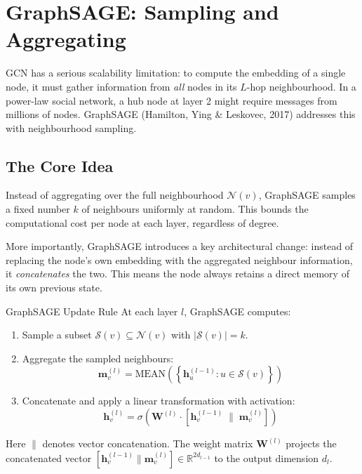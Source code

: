 \section{GraphSAGE: Sampling and Aggregating}

GCN has a serious scalability limitation: to compute the embedding of a single node, it must gather information from \emph{all} nodes in its $L$-hop neighbourhood. In a power-law social network, a hub node at layer 2 might require messages from millions of nodes. GraphSAGE (Hamilton, Ying \& Leskovec, 2017) addresses this with neighbourhood sampling.

\subsection{The Core Idea}

Instead of aggregating over the full neighbourhood $\mathcal{N}(v)$, GraphSAGE samples a fixed number $k$ of neighbours uniformly at random. This bounds the computational cost per node at each layer, regardless of degree.

More importantly, GraphSAGE introduces a key architectural change: instead of replacing the node's own embedding with the aggregated neighbour information, it \emph{concatenates} the two. This means the node always retains a direct memory of its own previous state.

\begin{mathbox}{GraphSAGE Update Rule}
At each layer $l$, GraphSAGE computes:
\begin{enumerate}[noitemsep]
    \item Sample a subset $\mathcal{S}(v) \subseteq \mathcal{N}(v)$ with $|\mathcal{S}(v)| = k$.
    \item Aggregate the sampled neighbours:
    \[
        \mathbf{m}_v^{(l)} = \text{MEAN}\!\left(\left\{\mathbf{h}_u^{(l-1)} : u \in \mathcal{S}(v)\right\}\right)
    \]
    \item Concatenate and apply a linear transformation with activation:
    \begin{equation}
        \mathbf{h}_v^{(l)} = \sigma\!\left(\mathbf{W}^{(l)} \cdot \left[\mathbf{h}_v^{(l-1)}\; \big\|\; \mathbf{m}_v^{(l)}\right]\right)
        \label{eq:sage}
    \end{equation}
\end{enumerate}
Here $\|$ denotes vector concatenation. The weight matrix $\mathbf{W}^{(l)}$ projects the concatenated vector $[\mathbf{h}_v^{(l-1)} \| \mathbf{m}_v^{(l)}] \in \mathbb{R}^{2d_{l-1}}$ to the output dimension $d_l$.
\end{mathbox}


